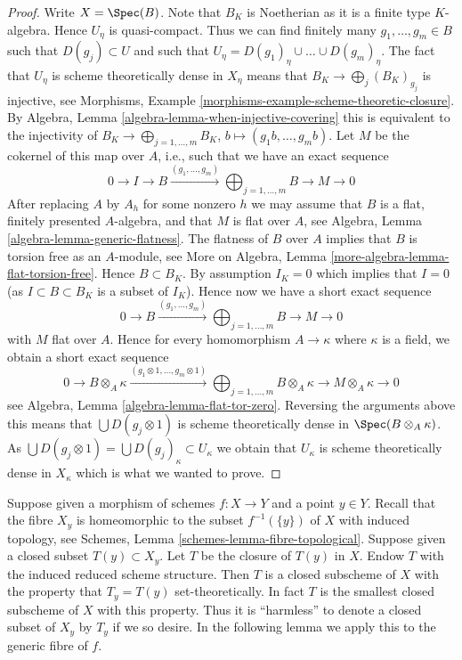 \begin{proof}
\medskip\noindent
Write $X = \Spec(B)$. Note that $B_K$ is Noetherian as it is a
finite type $K$-algebra. Hence $U_\eta$ is quasi-compact. Thus we can
find finitely many $g_1, \ldots, g_m \in B$ such that $D(g_j) \subset U$
and such that $U_\eta = D(g_1)_\eta \cup \ldots \cup D(g_m)_\eta$.
The fact that $U_\eta$ is scheme theoretically dense in
$X_\eta$ means that $B_K \to \bigoplus_j (B_K)_{g_j}$
is injective, see
Morphisms, Example \ref{morphisms-example-scheme-theoretic-closure}.
By
Algebra, Lemma \ref{algebra-lemma-when-injective-covering}
this is equivalent to the injectivity of
$B_K \to \bigoplus\nolimits_{j = 1, \ldots, m} B_K$,
$b \mapsto (g_1b, \ldots, g_mb)$. Let $M$ be the cokernel of this
map over $A$, i.e., such that we have an exact sequence
$$
0 \to I \to B \xrightarrow{(g_1, \ldots, g_m)}
\bigoplus\nolimits_{j = 1, \ldots, m} B \to M \to 0
$$
After replacing $A$ by $A_h$ for some nonzero $h$ we may assume that $B$
is a flat, finitely presented $A$-algebra, and that $M$
is flat over $A$, see
Algebra, Lemma \ref{algebra-lemma-generic-flatness}.
The flatness of $B$ over $A$ implies that $B$ is torsion free as an
$A$-module, see
More on Algebra, Lemma \ref{more-algebra-lemma-flat-torsion-free}.
Hence $B \subset B_K$. By assumption $I_K = 0$ which implies that $I = 0$
(as $I \subset B \subset B_K$ is a subset of $I_K$). Hence now
we have a short exact sequence
$$
0 \to B \xrightarrow{(g_1, \ldots, g_m)}
\bigoplus\nolimits_{j = 1, \ldots, m} B \to M \to 0
$$
with $M$ flat over $A$. Hence for every homomorphism $A \to \kappa$ where
$\kappa$ is a field, we obtain a short exact sequence
$$
0 \to B \otimes_A \kappa \xrightarrow{(g_1 \otimes 1, \ldots, g_m \otimes 1)}
\bigoplus\nolimits_{j = 1, \ldots, m} B \otimes_A \kappa \to
M \otimes_A \kappa \to 0
$$
see
Algebra, Lemma \ref{algebra-lemma-flat-tor-zero}.
Reversing the arguments above
this means that $\bigcup D(g_j \otimes 1)$ is scheme
theoretically dense in $\Spec(B \otimes_A \kappa)$.
As $\bigcup D(g_j \otimes 1) = \bigcup D(g_j)_\kappa \subset U_\kappa$
we obtain that $U_\kappa$ is scheme theoretically dense in $X_\kappa$
which is what we wanted to prove.
\end{proof}

\noindent
Suppose given a morphism of schemes $f : X \to Y$ and
a point $y \in Y$. Recall that the fibre $X_y$ is homeomorphic
to the subset $f^{-1}(\{y\})$ of $X$ with induced topology, see
Schemes, Lemma \ref{schemes-lemma-fibre-topological}.
Suppose given a closed subset $T(y) \subset X_y$.
Let $T$ be the closure of $T(y)$ in $X$.
Endow $T$ with the induced reduced scheme structure.
Then $T$ is a closed subscheme of $X$ with the property
that $T_y = T(y)$ set-theoretically. In fact $T$ is the smallest
closed subscheme of $X$ with this property. Thus it is ``harmless''
to denote a closed subset of $X_y$ by $T_y$ if we so desire.
In the following lemma we apply this to the generic fibre of $f$.

